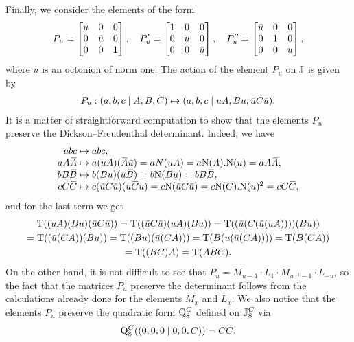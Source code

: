 Finally, we consider the elements of the form 
\begin{equation}
	P_u = \begin{bmatrix}
		u & 0 & 0 \\
		0 & \ovu & 0 \\
		0 & 0 & 1
	\end{bmatrix},\quad 
	P_u' = \begin{bmatrix}
		1 & 0 & 0 \\
		0 & u & 0 \\
		0 & 0 & \ovu
	\end{bmatrix},\quad 
	P_u'' = \begin{bmatrix}
		\ovu & 0 & 0 \\
		0 & 1 & 0 \\
		0 & 0 & u
	\end{bmatrix},
\end{equation}
where $u$ is an octonion of norm one. The action of the element $P_u$ on $\mathbb{J}$ is given by
\begin{equation}
    \begin{array}{r@{\;}c@{\;}l}
	P_u: (a,b,c\mid A, B, C) & \mapsto & (a,b,c\mid uA, Bu, \ovu  C \ovu ).
    \end{array}
\end{equation}
It is a matter of straightforward computation to show that the elements $P_u$ preserve
the Dickson--Freudenthal determinant. Indeed, we have
\begin{equation}
    \begin{array}{r@{\;}c@{\;}l}
	abc & \mapsto & abc, \\
	a A \ovA  & \mapsto & a(uA)(\ovA \ovu ) = aN(uA) = a\NN(A).\NN(u) = a A\ovA , \\
	b B \ovB  & \mapsto & b(B u)(\ovu  \ovB ) = b\NN(B u) = b B \ovB , \\
	c C \ovC  & \mapsto & c(\ovu  C \ovu )(u \ovC  u) =
	    c\NN(\ovu  C \ovu  ) = c \NN(C).\NN(u)^2 = c C \ovC ,
    \end{array}
\end{equation}
and for the last term we get
\begin{multline}
    \Tr((uA)(Bu)(\ovu  C\ovu  )) = \Tr((\ovu  C\ovu  )(uA)(Bu)) =
    \Tr((\ovu  (C(\ovu  (uA))))(Bu)) \\
    = \Tr((\ovu  (CA))(Bu)) = \Tr((Bu)(\ovu  (CA))) = \Tr(B(u(\ovu  (CA)))) = \Tr(B(CA))  \\
    = \Tr((BC)A) = \Tr(ABC).
\end{multline}
On the other hand, it is not difficult to see that $P_u = M_{u-1} \cdot L_1 \cdot M_{u^{-1}-1} \cdot L_{-u}$,
so the fact that the matrices $P_u$ preserve the determinant follows from the calculations already done for
the elements $M_x$ and $L_x$. We also notice that the elements $P_u$ preserve
the quadratic form $\mathord{\mathrm{Q}}_8^C$ defined on $\mathbb{J}_8^C$ via
\begin{equation}
	\mathord{\mathrm{Q}}_8^C( (0,0,0\mid 0,0,C) ) = C\mathord{\mbox{\hspace*{0pt}}\,\overline{\!C\!\!\;}\!\:}\mbox{\hspace*{0pt}}.
\end{equation}

